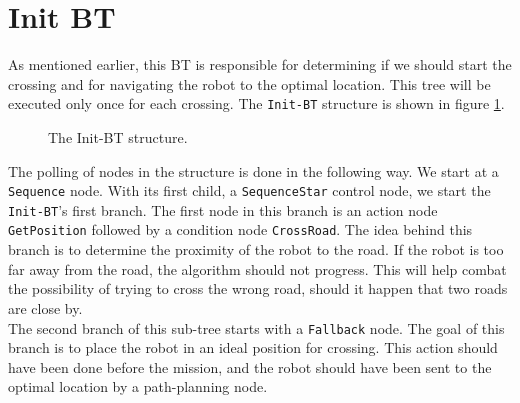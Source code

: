 \section{Init BT}
\label{sec:Init-BT}
    As mentioned earlier, this BT is responsible for determining if we should start the crossing and for navigating the robot to the optimal location. This tree will be executed only once for each crossing. The \texttt{Init-BT} structure is shown in figure \ref{fig:Init-BT}.\\
    \begin{figure}[ht]
        \caption{The Init-BT structure.}
        \label{fig:Init-BT}
    \end{figure}
    The polling of nodes in the structure is done in the following way. We start at a \texttt{Sequence} node. With its first child, a \texttt{SequenceStar} control node, we start the \texttt{Init-BT}'s first branch. The first node in this branch is an action node \texttt{GetPosition} followed by a condition node \texttt{CrossRoad}. The idea behind this branch is to determine the proximity of the robot to the road. If the robot is too far away from the road, the algorithm should not progress. This will help combat the possibility of trying to cross the wrong road, should it happen that two roads are close by.\\
    The second branch of this sub-tree starts with a \texttt{Fallback} node. The goal of this branch is to place the robot in an ideal position for crossing. This action should have been done before the mission, and the robot should have been sent to the optimal location by a path-planning node.\\
